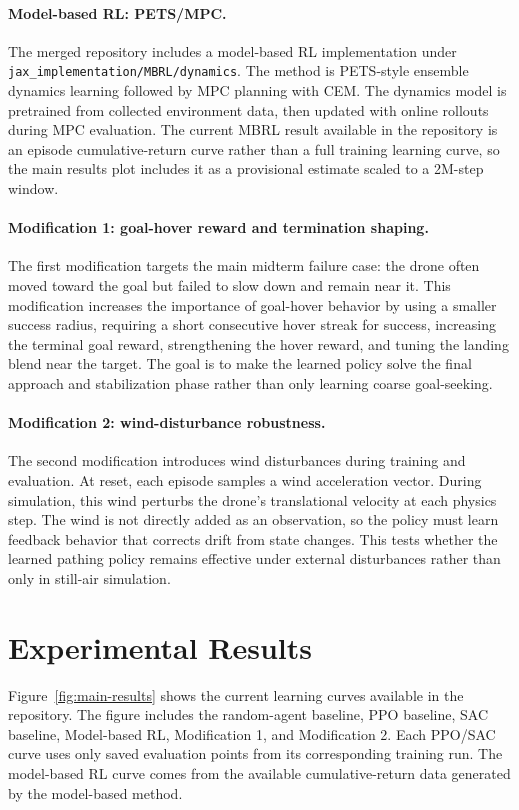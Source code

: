\documentclass{article}
\begin{document}
\paragraph{Model-based RL: PETS/MPC.}
The merged repository includes a model-based RL implementation under \texttt{jax\_implementation/MBRL/dynamics}. The method is PETS-style ensemble dynamics learning followed by MPC planning with CEM. The dynamics model is pretrained from collected environment data, then updated with online rollouts during MPC evaluation. The current MBRL result available in the repository is an episode cumulative-return curve rather than a full training learning curve, so the main results plot includes it as a provisional estimate scaled to a 2M-step window.

\paragraph{Modification 1: goal-hover reward and termination shaping.}
The first modification targets the main midterm failure case: the drone often moved toward the goal but failed to slow down and remain near it. This modification increases the importance of goal-hover behavior by using a smaller success radius, requiring a short consecutive hover streak for success, increasing the terminal goal reward, strengthening the hover reward, and tuning the landing blend near the target. The goal is to make the learned policy solve the final approach and stabilization phase rather than only learning coarse goal-seeking.

\paragraph{Modification 2: wind-disturbance robustness.}
The second modification introduces wind disturbances during training and evaluation. At reset, each episode samples a wind acceleration vector. During simulation, this wind perturbs the drone's translational velocity at each physics step. The wind is not directly added as an observation, so the policy must learn feedback behavior that corrects drift from state changes. This tests whether the learned pathing policy remains effective under external disturbances rather than only in still-air simulation.

\section{Experimental Results}
Figure~\ref{fig:main-results} shows the current learning curves available in the repository. The figure includes the random-agent baseline, PPO baseline, SAC baseline, Model-based RL, Modification 1, and Modification 2. Each PPO/SAC curve uses only saved evaluation points from its corresponding training run. The model-based RL curve comes from the available cumulative-return data generated by the model-based method.
\end{document}
